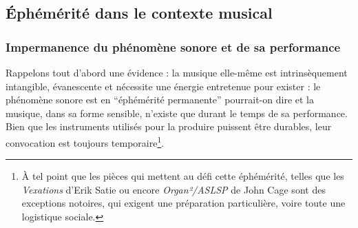 



\subsection{Éphémérité dans le contexte musical}
\label{sec:ephemeral:ephemerality_in_musical_context}

\subsubsection{Impermanence du phénomène sonore et de sa performance}
\noindent Rappelons tout d'abord une évidence : la musique elle-même est intrinsèquement intangible, évanescente et nécessite une énergie entretenue pour exister : le phénomène sonore est en ``éphémérité permanente'' pourrait-on dire et la musique, dans sa forme sensible, n'existe que durant le temps de sa performance. Bien que les instruments utilisés pour la produire puissent être durables, leur convocation est toujours temporaire\footnote{À tel point que les pièces qui mettent au défi cette éphémérité, telles que les \textit{Vexations} d'Erik Satie ou encore \textit{Organ²/ASLSP} de John Cage sont des exceptions notoires, qui exigent une préparation particulière, voire toute une logistique sociale.}.\\
